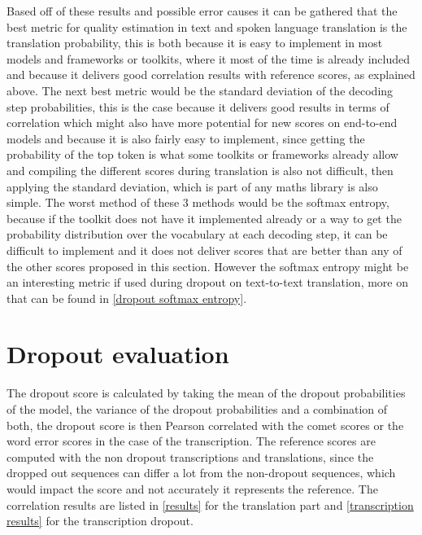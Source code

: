 Based off of these results and possible error causes it can be gathered that the best metric for quality estimation in text and spoken language translation is the translation probability, this is both because it is easy to implement in most models and frameworks or toolkits, where it most of the time is already included and because it delivers good correlation results with reference scores, as explained above.
The next best metric would be the standard deviation of the decoding step probabilities, this is the case because it delivers good results in terms of correlation which might also have more potential for new scores on end-to-end models and because it is also fairly easy to implement, since getting the probability of the top token is what some toolkits or frameworks already allow and compiling the different scores during translation is also not difficult, then applying the standard deviation, which is part of any maths library is also simple. 
The worst method of these 3 methods would be the softmax entropy, because if the toolkit does not have it implemented already or a way to get the probability distribution over the vocabulary at each decoding step, it can be difficult to implement and it does not deliver scores that are better than any of the other scores proposed in this section. However the softmax entropy might be an interesting metric if used during dropout on text-to-text translation, more on that can be found in \autoref{dropout softmax entropy}.

\section{Dropout evaluation}
The dropout score is calculated by taking the mean of the dropout probabilities of the model, the variance of the dropout probabilities and a combination of both, the dropout score is then Pearson correlated with the comet scores or the word error scores in the case of the transcription. 
The reference scores are computed with the non dropout transcriptions and translations, since the dropped out sequences can differ a lot from the non-dropout sequences, which would impact the score and not accurately it represents the reference. 
The correlation results are listed in \autoref{results} for the translation part and \autoref{transcription results} for the transcription dropout. 

